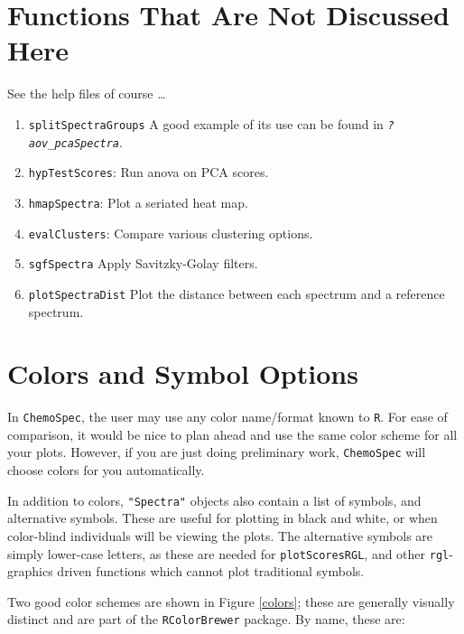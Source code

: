 \documentclass[letter,10pt,twocolumn,twoside,printwatermark=false]{pinp}
\begin{document}
\hypertarget{functions-that-are-not-discussed-here}{%
\section{Functions That Are Not Discussed
Here}\label{functions-that-are-not-discussed-here}}

See the help files of course \ldots

\begin{enumerate}
  \item \texttt{splitSpectraGroups}  A good example of its use can be found in \texttt{\textsl{?aov\_pcaSpectra}}.
  \item \texttt{hypTestScores}: Run anova on PCA scores.
  \item \texttt{hmapSpectra}: Plot a seriated heat map.
  \item \texttt{evalClusters}: Compare various clustering options.
  \item \texttt{sgfSpectra} Apply Savitzky-Golay filters.
  \item \texttt{plotSpectraDist} Plot the distance between each spectrum and a reference spectrum.

\end{enumerate}

\hypertarget{colors-and-symbol-options}{%
\section{\texorpdfstring{Colors and Symbol Options
\label{ColSym}}{Colors and Symbol Options }}\label{colors-and-symbol-options}}

In \texttt{ChemoSpec}, the user may use any color name/format known to
\texttt{R}. For ease of comparison, it would be nice to plan ahead and
use the same color scheme for all your plots. However, if you are just
doing preliminary work, \texttt{ChemoSpec} will choose colors for you
automatically.

In addition to colors, \texttt{"Spectra"} objects also contain a list of
symbols, and alternative symbols. These are useful for plotting in black
and white, or when color-blind individuals will be viewing the plots.
The alternative symbols are simply lower-case letters, as these are
needed for \texttt{plotScoresRGL}, and other \texttt{rgl}-graphics
driven functions which cannot plot traditional symbols.

Two good color schemes are shown in Figure \ref{colors}; these are
generally visually distinct and are part of the \texttt{RColorBrewer}
package. By name, these are:
\end{document}
